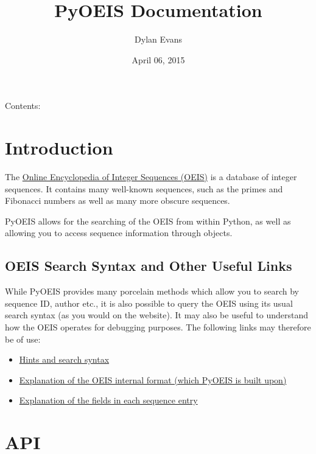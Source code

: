 \documentclass[letterpaper,10pt,english]{sphinxmanual}
\title{PyOEIS Documentation}
\date{April 06, 2015}
\author{Dylan Evans}
\begin{document}
\maketitle
\tableofcontents
{}\label{index::doc}


Contents:


\chapter{Introduction}
\label{introduction:introduction}\label{introduction::doc}\label{introduction:welcome-to-pyoeis-s-documentation}
The \href{http://www.oeis.org}{Online Encyclopedia of Integer Sequences (OEIS)} is
a database of integer sequences. It contains many well-known sequences, such as
the primes and Fibonacci numbers as well as many more obscure sequences.

PyOEIS allows for the searching of the OEIS from within Python, as well as
allowing you to access sequence information through
{\hyperref[api:sequence.Sequence]{\emph{}}} objects.


\section{OEIS Search Syntax and Other Useful Links}
\label{introduction:oeis-search-syntax-and-other-useful-links}
While PyOEIS provides many porcelain methods which allow you to search by
sequence ID, author etc., it is also possible to query the OEIS using its
usual search syntax (as you would on the website). It may also be useful to
understand how the OEIS operates for debugging purposes. The following links
may therefore be of use:
\begin{itemize}
\item {} 
\href{http://oeis.org/hints.html}{Hints and search syntax}

\item {} 
\href{http://oeis.org/eishelp1.html}{Explanation of the OEIS internal format (which PyOEIS is built upon)}

\item {} 
\href{http://oeis.org/eishelp2.html}{Explanation of the fields in each sequence entry}

\end{itemize}


\chapter{API}
\label{api:api}\label{api::doc}
\end{document}
